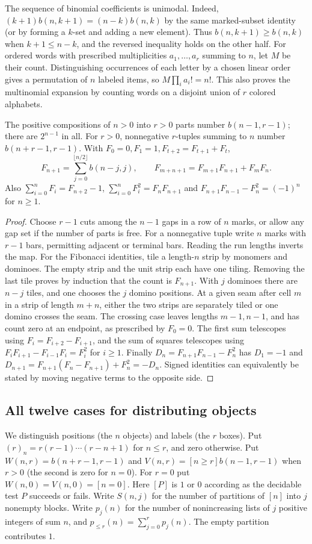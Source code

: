 The sequence of binomial coefficients is unimodal. Indeed,
$(k+1)b(n,k+1)=(n-k)b(n,k)$ by the same marked-subset identity (or by
forming a $k$-set and adding a new element). Thus $b(n,k+1)\ge b(n,k)$
when $k+1\le n-k$, and the reversed inequality holds on the other half.
For ordered words with prescribed multiplicities $a_1,\ldots,a_r$ summing
to $n$, let $M$ be their count. Distinguishing occurrences of each letter
by a chosen linear order gives a permutation of $n$ labeled items, so
$M\prod_i a_i!=n!$. This also proves the multinomial expansion by counting
words on a disjoint union of $r$ colored alphabets.

\begin{proposition}\label{result05}
The positive compositions of $n>0$ into $r>0$ parts number $b(n-1,r-1)$;
there are $2^{n-1}$ in all. For $r>0$, nonnegative $r$-tuples summing to
$n$ number $b(n+r-1,r-1)$. With $F_0=0,F_1=1,F_{t+2}=F_{t+1}+F_t$,
\[
 F_{n+1}=\sum_{j=0}^{\lfloor n/2\rfloor} b(n-j,j),\qquad
 F_{m+n+1}=F_{m+1}F_{n+1}+F_m F_n .
\]
Also $\sum_{i=0}^n F_i=F_{n+2}-1$,
$\sum_{i=0}^n F_i^2=F_nF_{n+1}$ and
$F_{n+1}F_{n-1}-F_n^2=(-1)^n$ for $n\ge1$.
\end{proposition}
\begin{proof}
Choose $r-1$ cuts among the $n-1$ gaps in a row of $n$ marks, or allow
any gap set if the number of parts is free. For a nonnegative tuple write
$n$ marks with $r-1$ bars, permitting adjacent or terminal bars. Reading
the run lengths inverts the map. For the Fibonacci identities, tile a
length-$n$ strip by monomers and dominoes. The empty strip and the unit
strip each have one tiling. Removing the last tile proves by induction that
the count is $F_{n+1}$. With $j$ dominoes there are $n-j$ tiles, and one
chooses the $j$ domino positions. At a given seam after cell $m$ in a
strip of length $m+n$, either the two strips are separately tiled or one
domino crosses the seam. The crossing case leaves lengths $m-1,n-1$,
and has count zero at an endpoint, as prescribed by $F_0=0$. The first
sum telescopes using $F_i=F_{i+2}-F_{i+1}$, and the sum of squares
telescopes using $F_iF_{i+1}-F_{i-1}F_i=F_i^2$ for $i\ge1$.
Finally $D_n=F_{n+1}F_{n-1}-F_n^2$ has $D_1=-1$ and
$D_{n+1}=F_{n+1}(F_n-F_{n+1})+F_n^2=-D_n$. Signed identities can
equivalently be stated by moving negative terms to the opposite side.
\end{proof}

\subsection{All twelve cases for distributing objects}
We distinguish positions (the $n$ objects) and labels (the $r$ boxes).
Put $(r)_n=r(r-1)\cdots(r-n+1)$ for $n\le r$, and zero otherwise.
Put $W(n,r)=b(n+r-1,r-1)$ and $V(n,r)=[n\ge r]b(n-1,r-1)$
when $r>0$ (the second is zero for $n=0$). For $r=0$ put
$W(n,0)=V(n,0)=[n=0]$. Here $[P]$ is $1$ or $0$ according as the
decidable test $P$ succeeds or fails. Write $S(n,j)$ for the number of
partitions of $[n]$ into $j$ nonempty blocks. Write $p_j(n)$ for the
number of nonincreasing lists of $j$ positive integers of sum $n$, and
$p_{\le r}(n)=\sum_{j=0}^r p_j(n)$. The empty partition contributes $1$.

